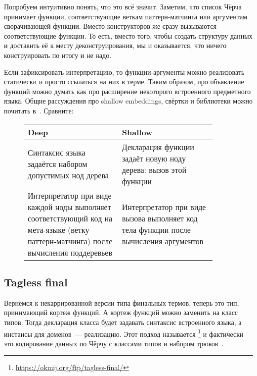 Попробуем интуитивно понять, что это всё значит.
Заметим, что список Чёрча принимает функции, соответствующие веткам паттерн-матчинга или аргументам сворачивающей функции.
Вместо конструкторов же сразу вызываются соответствующие функции.
То есть, вместо того, чтобы создать структуру данных и доставить её к месту деконструирования, мы  и оказывается, что ничего конструировать по итогу и не надо.

Если зафиксировать интерпретацию, то функции-аргументы можно реализовать статически и просто ссылаться на них в терме.
Таким образом, про объявление функций можно думать как про расширение некоторого встроенного предметного языка.
Общие рассуждения про shallow embeddings, свёртки и библиотеки можно почитать в~\cite{gibbons2013functional, gibbons2014folding}.
Сравните:
\begin{figure}[h]
    \centering
    \begin{tabular}{|p{0.45\linewidth}|p{0.45\linewidth}|}
        \hline
        Deep                                                                                                                                 & Shallow                                                                              \\
        \hline
        Синтаксис языка задаётся набором допустимых нод дерева                                                                               & Декларация функции задаёт новую ноду дерева: вызов этой функции                      \\
        \hline
        Интерпретатор при виде каждой ноды выполняет соответствующий код на мета-языке (ветку паттерн-матчинга) после вычисления поддеревьев & Интерпретатор при виде вызова выполняет код тела функции после вычисления аргументов \\
        \hline
    \end{tabular}
\end{figure}

\subsection{Tagless final}

Вернёмся к некаррированной версии типа финальных термов, теперь это тип, принимающий кортеж функций.
А кортеж функций можно заменить на класс типов.
Тогда декларация класса будет задавать синтаксис встроенного языка, а инстансы для доменов~--- реализацию.
Этот подход называется \footnote{\url{https://okmij.org/ftp/tagless-final/}} и фактически это кодирование данных по Чёрчу с классами типов и набором трюков~\cite{carette2007finally, kiselyov2012typed}.

